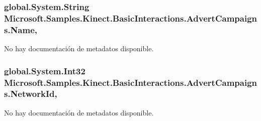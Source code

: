 \hypertarget{class_microsoft_1_1_samples_1_1_kinect_1_1_basic_interactions_1_1_advert_campaigns_a47494e39401e8067bfaec193b5a218b1}{
\subsubsection[{Name}]{\setlength{\rightskip}{0pt plus 5cm}global.\-System.\-String Microsoft.\-Samples.\-Kinect.\-Basic\-Interactions.\-Advert\-Campaigns.\-Name\hspace{0.3cm}{\ttfamily [get]}, {\ttfamily [set]}}}\label{class_microsoft_1_1_samples_1_1_kinect_1_1_basic_interactions_1_1_advert_campaigns_a47494e39401e8067bfaec193b5a218b1}


No hay documentación de metadatos disponible. 

\hypertarget{class_microsoft_1_1_samples_1_1_kinect_1_1_basic_interactions_1_1_advert_campaigns_ad5e6057af4eb97a6fd786d9f787da92b}{
\subsubsection[{Network\-Id}]{\setlength{\rightskip}{0pt plus 5cm}global.\-System.\-Int32 Microsoft.\-Samples.\-Kinect.\-Basic\-Interactions.\-Advert\-Campaigns.\-Network\-Id\hspace{0.3cm}{\ttfamily [get]}, {\ttfamily [set]}}}\label{class_microsoft_1_1_samples_1_1_kinect_1_1_basic_interactions_1_1_advert_campaigns_ad5e6057af4eb97a6fd786d9f787da92b}


No hay documentación de metadatos disponible. 

